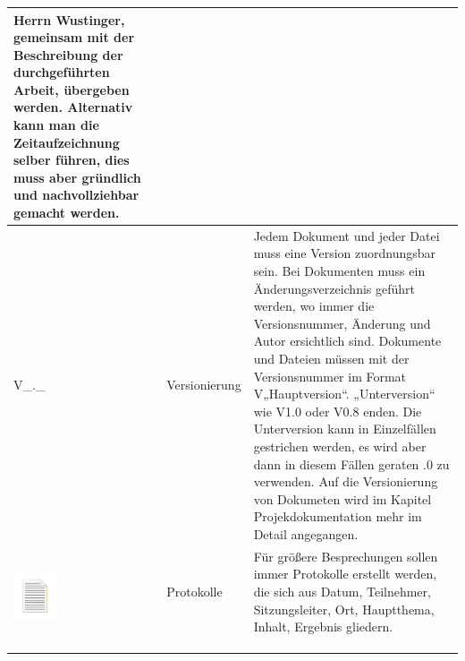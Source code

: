 \begin{center}
\begin{scriptsize}
\begin{tabularx}{\textwidth}{|p{3cm}|p{3cm}|X|}
    Herrn Wustinger, gemeinsam mit der Beschreibung der
    durchgeführten Arbeit, übergeben werden.
    Alternativ kann man die Zeitaufzeichnung selber führen,
    dies muss aber gründlich und nachvollziehbar gemacht
    werden. \\
    \hline
    \begin{center}
        \vspace{0.5cm}
        \huge V\_.\_
    \end{center}& Versionierung &
    Jedem Dokument und jeder Datei muss eine Version
    zuordnungsbar sein. Bei Dokumenten muss ein
    Änderungsverzeichnis geführt werden, wo immer die
    Versionsnummer, Änderung und Autor ersichtlich sind.
    Dokumente und Dateien müssen mit der Versionsnummer
    im Format V„Hauptversion“. „Unterversion“ wie V1.0 oder
    V0.8 enden. Die Unterversion kann in Einzelfällen
    gestrichen werden, es wird aber dann in diesem Fällen
    geraten .0 zu verwenden. \newline Auf die Versionierung von Dokumeten wird im Kapitel Projekdokumentation mehr im Detail angegangen. \\
    \hline
    \multirow{4}{*}{\begin{minipage}{3cm}
    \begin{center}
        \vspace{0.0cm}
        \includegraphics[width=50]{images/sr/4.png}
    \end{center}
    \end{minipage}} & Protokolle 
    & Für größere Besprechungen sollen immer Protokolle erstellt
    werden, die sich aus Datum, Teilnehmer, Sitzungsleiter,
    Ort, Hauptthema, Inhalt, Ergebnis gliedern. \\
    & & \\
    & & \\
    \hline
    \multirow{4}{*}{\begin{minipage}{3cm}
    \begin{center}
        \vspace{0.3cm}

\end{center}
\end{minipage}}
\end{tabularx}
\end{scriptsize}
\end{center}
